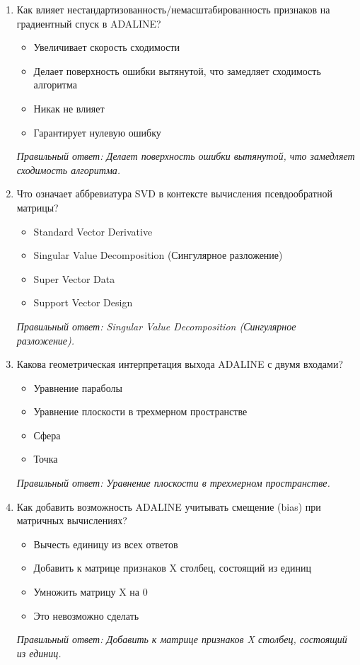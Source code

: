 \begin{enumerate}[label=\textbf{\arabic*.}, leftmargin=0pt, itemsep=1.2em]
\item Как влияет нестандартизованность/немасштабированность признаков на градиентный спуск в ADALINE?
\begin{itemize}[label=$\square$, leftmargin=1.5cm, itemsep=0.2em, topsep=0.3em]
\item Увеличивает скорость сходимости
\item Делает поверхность ошибки вытянутой, что замедляет сходимость алгоритма
\item Никак не влияет
\item Гарантирует нулевую ошибку
\end{itemize}
{\small\textit{Правильный ответ: Делает поверхность ошибки вытянутой, что замедляет сходимость алгоритма.}}

\item Что означает аббревиатура SVD в контексте вычисления псевдообратной матрицы?
\begin{itemize}[label=$\square$, leftmargin=1.5cm, itemsep=0.2em, topsep=0.3em]
\item Standard Vector Derivative
\item Singular Value Decomposition (Сингулярное разложение)
\item Super Vector Data
\item Support Vector Design
\end{itemize}
{\small\textit{Правильный ответ: Singular Value Decomposition (Сингулярное разложение).}}

\item Какова геометрическая интерпретация выхода ADALINE с двумя входами?
\begin{itemize}[label=$\square$, leftmargin=1.5cm, itemsep=0.2em, topsep=0.3em]
\item Уравнение параболы
\item Уравнение плоскости в трехмерном пространстве
\item Сфера
\item Точка
\end{itemize}
{\small\textit{Правильный ответ: Уравнение плоскости в трехмерном пространстве.}}

\item Как добавить возможность ADALINE учитывать смещение (bias) при матричных вычислениях?
\begin{itemize}[label=$\square$, leftmargin=1.5cm, itemsep=0.2em, topsep=0.3em]
\item Вычесть единицу из всех ответов
\item Добавить к матрице признаков X столбец, состоящий из единиц
\item Умножить матрицу X на 0
\item Это невозможно сделать
\end{itemize}
{\small\textit{Правильный ответ: Добавить к матрице признаков X столбец, состоящий из единиц.}}


\end{enumerate}
